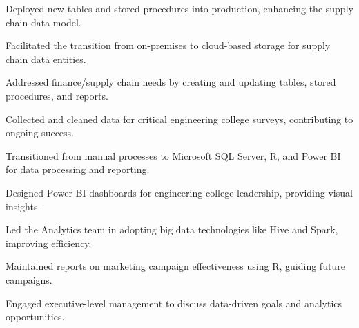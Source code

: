 \documentclass[]{plushcv}
\begin{document}
\begin{minipage}[t]{0.70\textwidth}

\begin{tightemize}
\sectionsep
\item Deployed new tables and stored procedures into production, enhancing the supply chain data model.
\item Facilitated the transition from on-premises to cloud-based storage for supply chain data entities.
\item Addressed finance/supply chain needs by creating and updating tables, stored procedures, and reports.
\end{tightemize}
\sectionsep

\begin{tightemize}
\sectionsep
\item Collected and cleaned data for critical engineering college surveys, contributing to ongoing success.
\item Transitioned from manual processes to Microsoft SQL Server, R, and Power BI for data processing and reporting.
\item Designed Power BI dashboards for engineering college leadership, providing visual insights.
\end{tightemize}
\sectionsep

\begin{tightemize}
\sectionsep
\item Led the Analytics team in adopting big data technologies like Hive and Spark, improving efficiency.
\item Maintained reports on marketing campaign effectiveness using R, guiding future campaigns.
\item Engaged executive-level management to discuss data-driven goals and analytics opportunities.
\end{tightemize}
\sectionsep

%
%

\end{minipage} 
\hfill
\end{document}
